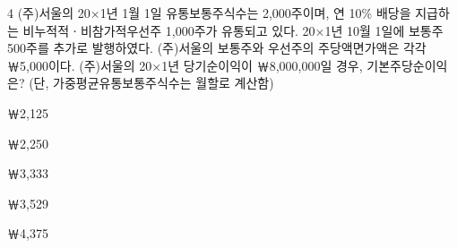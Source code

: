 \begin{question}{4}
(주)서울의 20×1년 1월 1일 유통보통주식수는 2,000주이며, 연 10\% 배당을 지급하는 비누적적ㆍ비참가적우선주 1,000주가 유통되고 있다. 20×1년 10월 1일에 보통주 500주를 추가로 발행하였다. (주)서울의 보통주와 우선주의 주당액면가액은 각각 ￦5,000이다. (주)서울의 20×1년 당기순이익이 ￦8,000,000일 경우, 기본주당순이익은? (단, 가중평균유통보통주식수는 월할로 계산함)
\begin{choices}
  \item ￦2,125
  \item ￦2,250
  \item ￦3,333
  \item ￦3,529
  \item ￦4,375
\end{choices}
\end{question}
